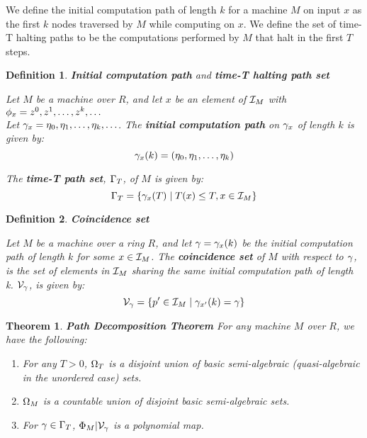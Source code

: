 \documentclass[twoside]{article}
\newtheorem{theorem}{Theorem}[section]
\newtheorem{definition}{Definition}[section]
\begin{document}
  We define the initial computation path of length $k$ for a machine
  $M$ on input $x$ as the first $k$ nodes traversed by $M$ while
  computing on $x$.  We define the set of time-T halting paths to be the
  computations performed by $M$ that halt in the first $T$ steps.

  \begin{definition}{\textbf{Initial computation path} and \textbf{time-T halting path set}}

    Let $M$ be a machine over $R$, and let $x$ be an element of
    $\mathcal{I}_M$ with $\phi_x = z^0, z^1, \ldots, z^k, \ldots$ \\
    Let $\gamma_x = \eta_0, \eta_1, \ldots, \eta_k, \ldots$.  
    The \textbf{initial computation path} on $\gamma_x$ of
    length $k$ is given by: 
    $$\gamma_x(k) = (\eta_0, \eta_1, \ldots,\eta_k)$$

    The \textbf{time-T path set}, $\Gamma_{T}$, of $M$ is given by:
    $$\Gamma_{T} = \{\gamma_x(T) \mid T(x) \leq T, x \in \mathcal{I}_M\}$$

  \end{definition}
  
  \begin{definition}{\textbf{Coincidence set}}

    Let $M$ be a machine over a ring $R$, and let $\gamma = \gamma_{x}(k)$ be
    the initial computation path of length $k$ for some $x \in
    \mathcal{I}_M$. The \textbf{coincidence set} of $M$ with respect to $\gamma$, is the
    set of elements in $\mathcal{I}_M$ sharing the same initial computation path of length k.
    $\mathcal{V}_{\gamma}$, is given by:
    $$\mathcal{V}_{\gamma} = 
    \{p' \in \mathcal{I}_M \mid \gamma_{x'}(k) = \gamma\}$$
    
    \emph{}

  \end{definition}

  \begin{theorem}{\textbf{Path Decomposition Theorem}}
    For any machine $M$ over $R$, we have the following:

    \begin{enumerate}
    \item For any $T > 0$, $\Omega_T$ is a disjoint union of basic
      semi-algebraic (quasi-algebraic in the unordered case) sets.

    \item $\Omega_M$ is a countable union of disjoint basic
      semi-algebraic sets.

    \item For $\gamma \in \Gamma_{T}$,
      $\Phi_M|\mathcal{V}_{\gamma}$ is a polynomial map.
    \end{enumerate}
  \end{theorem}
\end{document}
